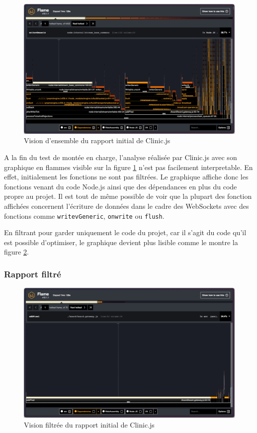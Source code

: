 \begin{figure}[H]
  \centering
  \includegraphics[width=1\textwidth]{./assets/figures/flame/flame1-overview.png}
  \caption{Vision d'ensemble du rapport initial de Clinic.js}
  \label{fig:flame1-overview}
\end{figure}

A la fin du test de montée en charge, l'analyse réalisée par Clinic.js avec son graphique en flammes visible sur la figure \ref{fig:flame1-overview} n'est pas facilement interpretable. En effet, initialement les fonctions ne sont pas filtrées. Le graphique affiche donc les fonctions venant du code Node.js ainsi que des dépendances en plus du code propre au projet. Il est tout de même possible de voir que la plupart des fonction affichées concernent l'écriture de données dans le cadre des WebSockets avec des fonctions comme \texttt{writevGeneric}, \texttt{onwrite} ou \texttt{flush}.

En filtrant pour garder uniquement le code du projet, car il s'agit du code qu'il est possible d'optimiser, le graphique devient plus lisible comme le montre la figure \ref{fig:flame1-filtered}.

\subsubsection{Rapport filtré}

\begin{figure}[H]
  \centering
  \includegraphics[width=1\textwidth]{./assets/figures/flame/flame1-filtered.png}
  \caption{Vision filtrée du rapport initial de Clinic.js}
  \label{fig:flame1-filtered}
\end{figure}

